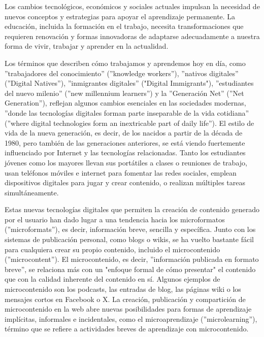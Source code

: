 Los cambios tecnológicos, económicos y sociales actuales impulsan la necesidad
de nuevos conceptos y estrategias para apoyar el aprendizaje permanente. La
educación, incluida la formación en el trabajo, necesita transformaciones que
requieren renovación y formas innovadoras de adaptarse adecuadamente a nuestra
forma de vivir, trabajar y aprender en la actualidad.
\cite{article:microlearning_buchem}

Los términos que describen cómo trabajamos y aprendemos hoy en día, como ''trabajadores
del conocimiento'' (''knowledge workers''), ''nativos digitales'' (''Digital
Natives''), ''inmigrantes digitales'' ("Digital Immigrants"), ''estudiantes del
nuevo milenio'' (''new millennium learners'') y la ''Generación Net'' (''Net
Generation''), reflejan algunos cambios esenciales en las sociedades modernas,
''donde las tecnologías digitales forman parte inseparable de la vida cotidiana''
(''where digital technologies form an inextricable part of daily life''). El
estilo de vida de la nueva generación, es decir, de los nacidos a partir de la
década de 1980, pero también de las generaciones anteriores, se está viendo
fuertemente influenciado por Internet y las tecnologías relacionadas. Tanto los
estudiantes jóvenes como los mayores llevan sus portátiles a clases o reuniones
de trabajo, usan teléfonos móviles e internet para fomentar las redes sociales,
emplean dispositivos digitales para jugar y crear contenido, o realizan
múltiples tareas simultáneamente.
\cite{article:microlearning_buchem}

Estas nuevas tecnologías digitales que permiten la creación de contenido
generado por el usuario han dado lugar a una tendencia hacia los microformatos
(''microformats''), es decir, información breve, sencilla y específica. Junto con
los sistemas de publicación personal, como blogs o wikis, se ha vuelto bastante
fácil para cualquiera crear su propio contenido, incluido el microcontenido
(''microcontent''). El microcontenido, es decir, ''información publicada en formato
breve'', se relaciona más con un "enfoque formal de cómo presentar" el contenido
que con la calidad inherente del contenido en sí. Algunos ejemplos de
microcontenido son los podcasts, las entradas de blog, las páginas wiki o los
mensajes cortos en Facebook o X. La creación, publicación y compartición de
microcontenido en la web abre nuevas posibilidades para formas de aprendizaje
implícitas, informales e incidentales, como el microaprendizaje
(''microlearning''), término que se refiere a actividades breves de aprendizaje
con microcontenido.
\cite{article:microlearning_buchem}